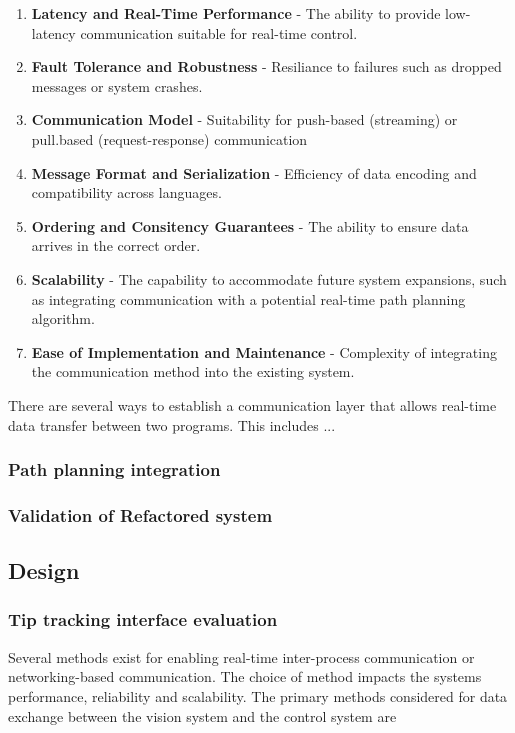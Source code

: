 \begin{enumerate}
    \item \textbf{Latency and Real-Time Performance} - The ability to provide low-latency communication suitable for real-time control.
    \item \textbf{Fault Tolerance and Robustness} - Resiliance to failures such as dropped messages or system crashes.
    \item \textbf{Communication Model} - Suitability for push-based (streaming) or pull.based (request-response) communication
    \item \textbf{Message Format and Serialization} - Efficiency of data encoding and compatibility across languages.
    \item \textbf{Ordering and Consitency Guarantees} - The ability to ensure data arrives in the correct order.
    \item \textbf{Scalability} - The capability to accommodate future system expansions, such as integrating communication with a potential real-time path planning algorithm.
    \item \textbf{Ease of Implementation and Maintenance} - Complexity of integrating the communication method into the existing system.
\end{enumerate}

There are several ways to establish a communication layer that allows real-time data transfer between two programs. This includes ...

\subsubsection{Path planning integration}

\subsubsection{Validation of Refactored system}

\subsection{Design}

\subsubsection{Tip tracking interface evaluation}
Several methods exist for enabling real-time inter-process communication or networking-based communication. The choice of method impacts the systems performance, reliability and scalability. The primary methods considered for data exchange between the vision system and the control system are


